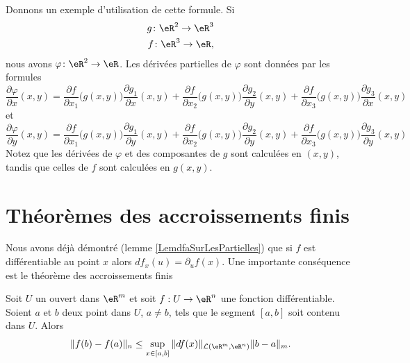 Donnons un exemple d'utilisation de cette formule. Si
\begin{equation}
	\begin{aligned}[]
		g\colon \eR^2\to \eR^3\\
		f\colon \eR^3\to \eR,
	\end{aligned}
\end{equation}
nous avons $\varphi\colon \eR^2\to \eR$. Les dérivées partielles de $\varphi$ sont données par les formules
\begin{equation}
	\frac{ \partial \varphi }{ \partial x }(x,y)=\frac{ \partial f }{ \partial x_1 }\big( g(x,y) \big)\frac{ \partial g_1 }{ \partial x }(x,y)+\frac{ \partial f }{ \partial x_2 }\big( g(x,y) \big)\frac{ \partial g_2 }{ \partial y }(x,y)+\frac{ \partial f }{ \partial x_3 }\big( g(x,y) \big)\frac{ \partial g_3 }{ \partial x }(x,y)
\end{equation}
et
\begin{equation}
	\frac{ \partial \varphi }{ \partial y }(x,y)=\frac{ \partial f }{ \partial x_1 }\big( g(x,y) \big)\frac{ \partial g_1 }{ \partial y }(x,y)+\frac{ \partial f }{ \partial x_2 }\big( g(x,y) \big)\frac{ \partial g_2 }{ \partial y }(x,y)+\frac{ \partial f }{ \partial x_3 }\big( g(x,y) \big)\frac{ \partial g_3 }{ \partial y }(x,y)
\end{equation}
Notez que les dérivées de $\varphi$ et des composantes de $g$ sont calculées en $(x,y)$, tandis que celles de $f$ sont calculées en $g(x,y)$.

\section{Théorèmes des accroissements finis}		\label{SecThoAccrsFinis}

Nous avons déjà démontré (lemme \ref{LemdfaSurLesPartielles}) que si $f$ est différentiable au point $x$ alors  $df_x(u)=\partial_uf(x)$. Une importante conséquence est le théorème des accroissements finis
\begin{theorem}\label{val_medio_2}
   Soit $U$ un ouvert dans $\eR^m$ et soit $f:U\to\eR^n$ une fonction différentiable. Soient $a$ et $b$ deux point dans $U$, $a\neq b$, tels que le segment $[a,b]$ soit contenu dans $U$. Alors
   \begin{equation}
        \|f(b)-f(a)\|_n\leq \sup_{x\in[a,b]}\|df(x)\|_{\mathcal{L}(\eR^m,\eR^n)}\|b-a\|_m.
   \end{equation}
\end{theorem}

